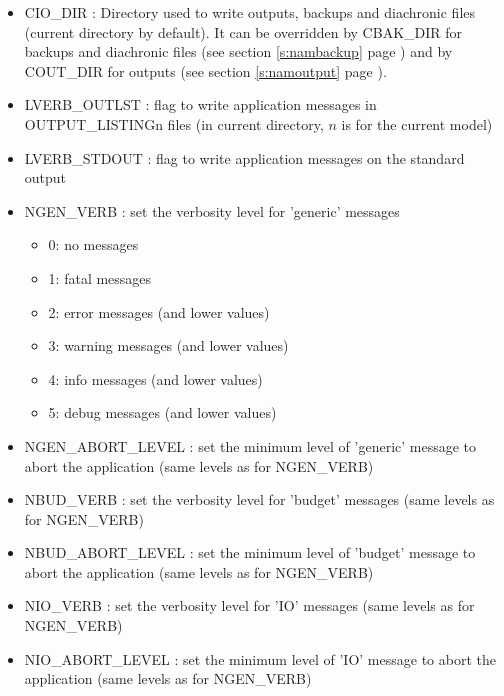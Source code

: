 \begin{itemize}

\item
CIO\_DIR : Directory used to write outputs, backups and diachronic files (current directory by default).
It can be overridden by CBAK\_DIR for backups and diachronic files (see section \ref{s:nambackup} page \pageref{s:nambackup})
and by COUT\_DIR for outputs (see section \ref{s:namoutput} page \pageref{s:namoutput}).

\item
LVERB\_OUTLST : flag to write application messages in OUTPUT\_LISTINGn files (in current directory, $n$ is for the current model)

\item
LVERB\_STDOUT : flag to write application messages on the standard output

\item
NGEN\_VERB : set the verbosity level for 'generic' messages
\begin{itemize}
\item 0: no messages
\item 1: fatal messages
\item 2: error messages (and lower values)
\item 3: warning messages (and lower values)
\item 4: info messages (and lower values)
\item 5: debug messages (and lower values)
\end{itemize}

\item
NGEN\_ABORT\_LEVEL : set the minimum level of 'generic' message to abort the application (same levels as for NGEN\_VERB)

\item
NBUD\_VERB : set the verbosity level for 'budget' messages (same levels as for NGEN\_VERB)

\item
NBUD\_ABORT\_LEVEL : set the minimum level of 'budget' message to abort the application (same levels as for NGEN\_VERB)

\item
NIO\_VERB : set the verbosity level for 'IO' messages (same levels as for NGEN\_VERB)

\item
NIO\_ABORT\_LEVEL : set the minimum level of 'IO' message to abort the application (same levels as for NGEN\_VERB)

\end{itemize}

